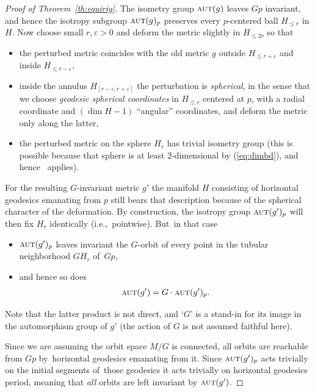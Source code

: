 \documentclass[pdftex]{sigma}%
\numberwithin{equation}{section}
\newcommand{\cat}[1]{\textsc{#1}}
\begin{document}
\begin{proof}[Proof of Theorem~\ref{th:equirig}]
 The isometry group $\cat{aut}(g)$ leaves $Gp$ invariant, and hence the isotropy subgroup $\cat{aut}(g)_p$ preserves every $p$-centered ball $H_{\le r}$ in $H$. Now choose small $r,\varepsilon>0$ and deform the metric slightly in $H_{\le 2r}$ so that
 \begin{itemize}\itemsep=0pt
 \item the perturbed metric coincides with the old metric $g$ outside $H_{\le r+\varepsilon}$ and inside $H_{\le r-\varepsilon}$,
 \item inside the annulus $H_{[r-\varepsilon,r+\varepsilon]}$ the perturbation is {\it spherical}, in the sense that we choose {\it geodesic spherical coordinates} \cite[Section~III.1]{chav} in $H_{\le r}$ centered at $p$, with a radial coor\-dinate and $(\dim H-1)$ ``angular'' coordinates, and deform the metric only along the latter,
 \item the perturbed metric on the sphere $H_r$ has trivial isometry group (this is possible because that sphere is at least $2$-dimensional by (\ref{eq:dimbd}), and hence~\cite[Proposition~8.3]{eb} applies).
 \end{itemize}
 For the resulting $G$-invariant metric $g'$ the manifold $H$ consisting of horizontal geodesics emanating from $p$ still bears that description because of the spherical character of the deformation. By construction, the isotropy group $\cat{aut}(g')_p$ will then fix $H_{r}$ identically (i.e.,~pointwise). But~in that case
\begin{itemize}\itemsep=0pt
\item $\cat{aut}(g')_p$ leaves invariant the $G$-orbit of every point in the tubular neighborhood $GH_{r}$ of~$Gp$,
\item and hence so does
 \begin{gather*}
 \cat{aut}(g') = G \cdot \cat{aut}(g')_p.
 \end{gather*}
\end{itemize}
Note that the latter product is not direct, and `$G$' is a stand-in for its image in the automorphism group of $g'$ (the action of $G$ is not assumed faithful here).

Since we are assuming the orbit space $M/G$ is connected, all orbits are reachable from $Gp$ by~horizontal geodesics emanating from it. Since $\cat{aut}(g')_p$ acts trivially on the initial segments of~those geodesics it acts trivially on horizontal geodesics period, meaning that {\it all} orbits are left invariant by $\cat{aut}(g')$.
\end{proof}
\end{document}
